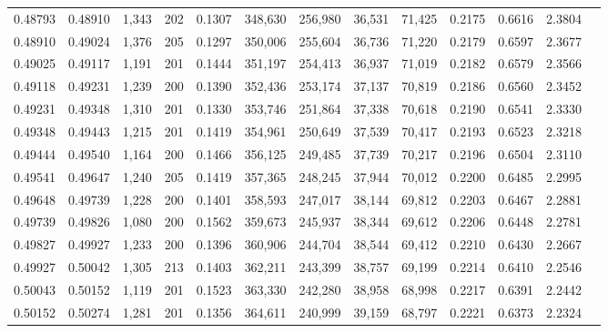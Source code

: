 \begin{tabular}{rrrrrrrrrrrrr}
0.48793 & 0.48910 & 1,343 & 202 &                                     0.1307 & 348,630 & 256,980 &  36,531 &  71,425 & 0.2175 & 0.6616 & 2.3804 \\
0.48910 & 0.49024 & 1,376 & 205 &                                     0.1297 & 350,006 & 255,604 &  36,736 &  71,220 & 0.2179 & 0.6597 & 2.3677 \\
0.49025 & 0.49117 & 1,191 & 201 &                                     0.1444 & 351,197 & 254,413 &  36,937 &  71,019 & 0.2182 & 0.6579 & 2.3566 \\
0.49118 & 0.49231 & 1,239 & 200 &                                     0.1390 & 352,436 & 253,174 &  37,137 &  70,819 & 0.2186 & 0.6560 & 2.3452 \\
0.49231 & 0.49348 & 1,310 & 201 &                                     0.1330 & 353,746 & 251,864 &  37,338 &  70,618 & 0.2190 & 0.6541 & 2.3330 \\
0.49348 & 0.49443 & 1,215 & 201 &                                     0.1419 & 354,961 & 250,649 &  37,539 &  70,417 & 0.2193 & 0.6523 & 2.3218 \\
0.49444 & 0.49540 & 1,164 & 200 &                                     0.1466 & 356,125 & 249,485 &  37,739 &  70,217 & 0.2196 & 0.6504 & 2.3110 \\
0.49541 & 0.49647 & 1,240 & 205 &                                     0.1419 & 357,365 & 248,245 &  37,944 &  70,012 & 0.2200 & 0.6485 & 2.2995 \\
0.49648 & 0.49739 & 1,228 & 200 &                                     0.1401 & 358,593 & 247,017 &  38,144 &  69,812 & 0.2203 & 0.6467 & 2.2881 \\
0.49739 & 0.49826 & 1,080 & 200 &                                     0.1562 & 359,673 & 245,937 &  38,344 &  69,612 & 0.2206 & 0.6448 & 2.2781 \\
0.49827 & 0.49927 & 1,233 & 200 &                                     0.1396 & 360,906 & 244,704 &  38,544 &  69,412 & 0.2210 & 0.6430 & 2.2667 \\
0.49927 & 0.50042 & 1,305 & 213 &                                     0.1403 & 362,211 & 243,399 &  38,757 &  69,199 & 0.2214 & 0.6410 & 2.2546 \\
0.50043 & 0.50152 & 1,119 & 201 &                                     0.1523 & 363,330 & 242,280 &  38,958 &  68,998 & 0.2217 & 0.6391 & 2.2442 \\
0.50152 & 0.50274 & 1,281 & 201 &                                     0.1356 & 364,611 & 240,999 &  39,159 &  68,797 & 0.2221 & 0.6373 & 2.2324 \\

\end{tabular}
